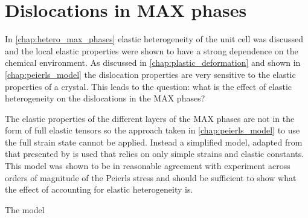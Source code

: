 
\chapter{Dislocations in MAX phases}

\label{chap:dislocations_in_max_phases}
\graphicspath{{plastic_deformation/Figs/}}






In \autoref{chap:hetero_max_phases} elastic heterogeneity of the unit cell was discussed and the local elastic properties were shown to have a strong dependence on the chemical environment. As discussed in  \autoref{chap:plastic_deformation} and shown in \autoref{chap:peierls_model} the dislocation properties are very sensitive to the elastic properties of a crystal. This leads to the question: what is the effect of elastic heterogeneity on the dislocations in the MAX phases?

The elastic properties of the different layers of the MAX phases are not in the form of full elastic tensors so the approach taken in \autoref{chap:peierls_model} to use the full strain state cannot be applied. Instead a simplified model, adapted from that presented by \citet{Clegg2006} is used that relies on only simple strains and elastic constants. This model was shown to be in reasonable agreement with experiment across orders of magnitude of the Peierls stress and should be sufficient to show what the effect of accounting for elastic heterogeneity is.

The model